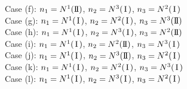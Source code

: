 \documentclass[11pt]{amsart}
\numberwithin{equation}{section} \numberwithin{theorem}{section}
\begin{document}
\begin{tabbing}
	\>Case (f): \>$n_1 = N^1({\text{I \hspace{-2.8mm} I} })$, \>$n_2 = N^3({\hspace{0.5mm}\text{I}\hspace{0.5mm}})$, \>$n_3 = N^2({\hspace{0.5mm}\text{I}\hspace{0.5mm}})$\\
	
	\>Case (g): \>$n_1 = N^1({\hspace{0.5mm}\text{I}\hspace{0.5mm}})$, \>$n_2 = N^2({\hspace{0.5mm}\text{I}\hspace{0.5mm}})$, \>$n_3 = N^3({\text{I \hspace{-2.8mm} I} })$\\
	
	\>Case (h): \>$n_1 = N^1({\hspace{0.5mm}\text{I}\hspace{0.5mm}})$, \>$n_2 = N^3({\hspace{0.5mm}\text{I}\hspace{0.5mm}})$, \>$n_3 = N^2({\text{I \hspace{-2.8mm} I} })$\\
	
	\>Case (i): \>$n_1 = N^1({\hspace{0.5mm}\text{I}\hspace{0.5mm}})$, \>$n_2 = N^2({\text{I \hspace{-2.8mm} I} })$, \>$n_3 = N^3({\hspace{0.5mm}\text{I}\hspace{0.5mm}})$\\
	
	\>Case (j): \>$n_1 = N^1({\hspace{0.5mm}\text{I}\hspace{0.5mm}})$, \>$n_2 = N^3({\text{I \hspace{-2.8mm} I} })$, \>$n_3 = N^2({\hspace{0.5mm}\text{I}\hspace{0.5mm}})$\\
	
	\>Case (k): \>$n_1 = N^1({\hspace{0.5mm}\text{I}\hspace{0.5mm}})$, \>$n_2 = N^2({\hspace{0.5mm}\text{I}\hspace{0.5mm}})$, \>$n_3 = N^3({\hspace{0.5mm}\text{I}\hspace{0.5mm}})$\\
	
	\>Case (l): \>$n_1 = N^1({\hspace{0.5mm}\text{I}\hspace{0.5mm}})$, \>$n_2 = N^3({\hspace{0.5mm}\text{I}\hspace{0.5mm}})$, \>$n_3 = N^2({\hspace{0.5mm}\text{I}\hspace{0.5mm}})$\\
\end{tabbing}
\end{document}
